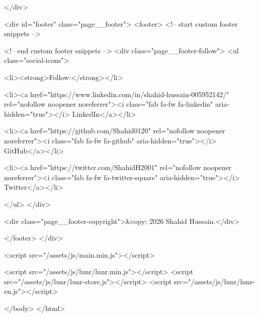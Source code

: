       </div>
    

    <div id="footer" class="page__footer">
      <footer>
        <!-- start custom footer snippets -->

<!-- end custom footer snippets -->
        <div class="page__footer-follow">
  <ul class="social-icons">
    
      <li><strong>Follow:</strong></li>
    

    
      
        
          <li><a href="https://www.linkedin.com/in/shahid-hussain-005952142/" rel="nofollow noopener noreferrer"><i class="fab fa-fw fa-linkedin" aria-hidden="true"></i> LinkedIn</a></li>
        
      
        
          <li><a href="https://github.com/Shahid0120" rel="nofollow noopener noreferrer"><i class="fab fa-fw fa-github" aria-hidden="true"></i> GitHub</a></li>
        
      
        
          <li><a href="https://twitter.com/ShahidH2001" rel="nofollow noopener noreferrer"><i class="fab fa-fw fa-twitter-square" aria-hidden="true"></i> Twitter</a></li>
        
      
    
  </ul>
</div>

<div class="page__footer-copyright">&copy; 2026 Shahid Hussain.</div>

      </footer>
    </div>

    
  <script src="/assets/js/main.min.js"></script>




<script src="/assets/js/lunr/lunr.min.js"></script>
<script src="/assets/js/lunr/lunr-store.js"></script>
<script src="/assets/js/lunr/lunr-en.js"></script>







  </body>
</html>